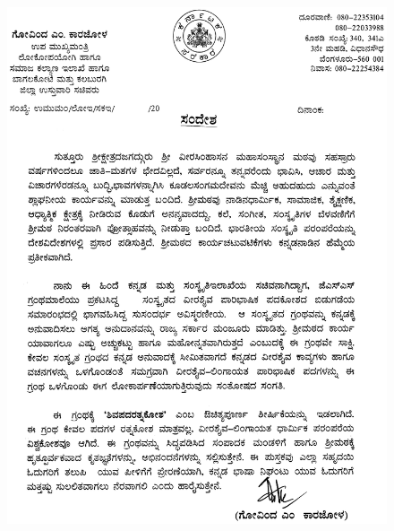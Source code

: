 \begin{figure}[H]
\centering
\includegraphics[scale=.84]{images/004.eps}
\end{figure}

\newpage

\thispagestyle{empty}

